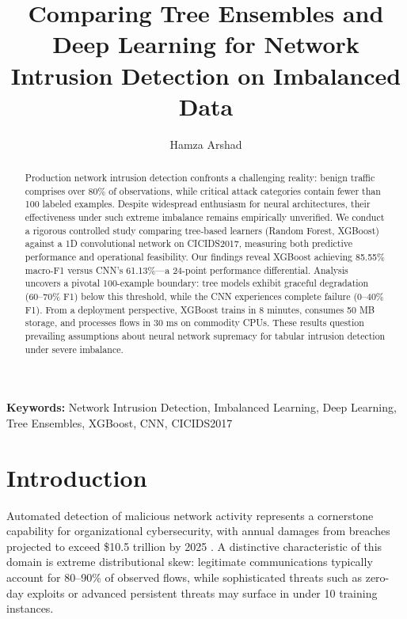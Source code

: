 \documentclass[10pt,twocolumn]{article}
\makeatletter
\renewcommand{\maketitle}{%
  \twocolumn[
    \begin{@twocolumnfalse}
      \begin{center}
        {\LARGE\bfseries \@title \par}
        \vskip 1em
        {\large \@author \par}
        \vskip 0.5em
      \end{center}
    \end{@twocolumnfalse}
  ]
}
\makeatother
\begin{document}
\title{\textbf{Comparing Tree Ensembles and Deep Learning for Network Intrusion Detection on Imbalanced Data}}

\author{
Hamza Arshad
}

\maketitle

\begin{abstract}
Production network intrusion detection confronts a challenging reality: benign traffic comprises over 80\% of observations, while critical attack categories contain fewer than 100 labeled examples. Despite widespread enthusiasm for neural architectures, their effectiveness under such extreme imbalance remains empirically unverified. We conduct a rigorous controlled study comparing tree-based learners (Random Forest, XGBoost) against a 1D convolutional network on CICIDS2017, measuring both predictive performance and operational feasibility. Our findings reveal XGBoost achieving 85.55\% macro-F1 versus CNN's 61.13\%---a 24-point performance differential. Analysis uncovers a pivotal 100-example boundary: tree models exhibit graceful degradation (60--70\% F1) below this threshold, while the CNN experiences complete failure (0--40\% F1). From a deployment perspective, XGBoost trains in 8 minutes, consumes 50 MB storage, and processes flows in 30 ms on commodity CPUs. These results question prevailing assumptions about neural network supremacy for tabular intrusion detection under severe imbalance.
\end{abstract}

\textbf{Keywords:} Network Intrusion Detection, Imbalanced Learning, Deep Learning, Tree Ensembles, XGBoost, CNN, CICIDS2017

\section{Introduction}

Automated detection of malicious network activity represents a cornerstone capability for organizational cybersecurity, with annual damages from breaches projected to exceed \$10.5 trillion by 2025 \cite{cybercrime2025}. A distinctive characteristic of this domain is extreme distributional skew: legitimate communications typically account for 80--90\% of observed flows, while sophisticated threats such as zero-day exploits or advanced persistent threats may surface in under 10 training instances.
\end{document}
